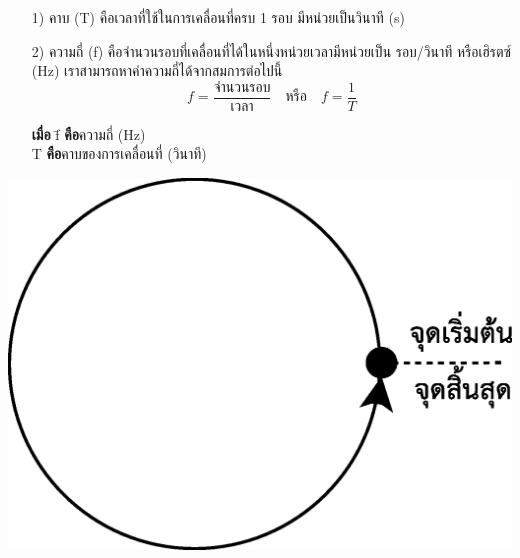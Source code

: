 \tcblower
\begin{minipage}{.6\textwidth}
	\begin{itemize}[leftmargin=*]
		\item[1)] คาบ (T)  คือเวลาที่ใช้ในการเคลื่อนที่ครบ  1 รอบ มีหน่วยเป็นวินาที (s)
		\item[2)] ความถี่ (f)  คือจำนวนรอบที่เคลื่อนที่ได้ในหนึ่งหน่วยเวลามีหน่วยเป็น  รอบ/วินาที  หรือเฮิรตซ์ (Hz)  เราสามารถหาค่าความถี่ได้จากสมการต่อไปนี้ \\
				  $$f = \frac{\text{จำนวนรอบ}}{\text{เวลา}} \quad \text{หรือ} \quad f = \frac{1}{T}$$
				\begin{tabbing}
					\textbf{เมื่อ} \quad 	\=f \quad\=\textbf{คือ}ความถี่ (Hz) \\
										\>T \>\textbf{คือ}คาบของการเคลื่อนที่ (วินาที)
				\end{tabbing}
	\end{itemize}
\end{minipage}
\hfill
\begin{adjustbox}{valign=c} 
    \begin{minipage}[t]{.35\linewidth}
        \includegraphics[width=\linewidth]{content-11.eps}
    \end{minipage}
\end{adjustbox}
